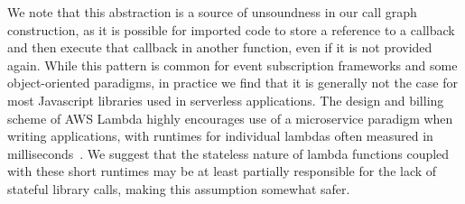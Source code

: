 \documentclass[letterpaper,twocolumn,10pt]{article}
\begin{document}
We note that this abstraction is a source of unsoundness in our call graph construction, as it is possible for imported code to store a reference to a callback and then execute that callback in another function, even if it is not provided again. While this pattern is common for event subscription frameworks and some object-oriented paradigms, in practice we find that it is generally not the case for most Javascript libraries used in serverless applications. The design and billing scheme of AWS Lambda highly encourages use of a microservice paradigm when writing applications, with runtimes for individual lambdas often measured in milliseconds~\cite{microservice}. We suggest that the stateless nature of lambda functions coupled with these short runtimes may be at least partially responsible for the lack of stateful library calls, making this assumption somewhat safer.



%
\end{document}
